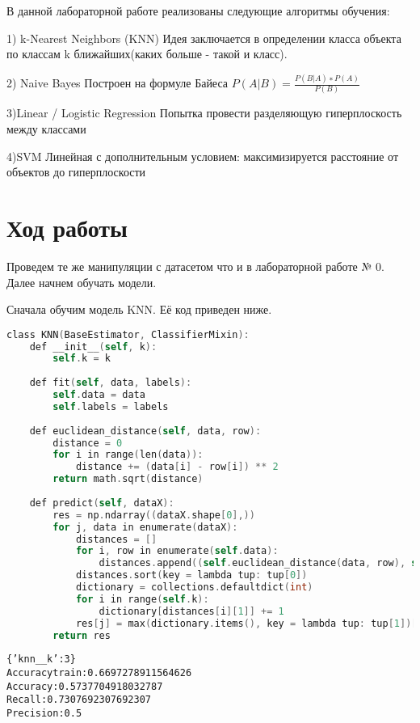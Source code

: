 В данной лабораторной работе реализованы следующие алгоритмы обучения:

1) k-Nearest Neighbors (KNN)
Идея заключается в определении класса объекта по классам k ближайших(каких
больше - такой и класс).

2) Naive Bayes
Построен на формуле Байеса  $ P(A|B)=  \frac{P(B|A)∗P(A) } {P(B)} $

3)Linear / Logistic Regression
Попытка провести разделяющую гиперплоскость между классами

4)SVM
Линейная с дополнительным условием: максимизируется расстояние от объектов до
гиперплоскости




\pagebreak

\section{Ход работы}


Проведем те же манипуляции с датасетом что и в лабораторной работе № 0.\\
Далее начнем обучать модели.

Сначала обучим модель KNN. Её код приведен ниже.

\begin{lstlisting}[language=C]
class KNN(BaseEstimator, ClassifierMixin):
    def __init__(self, k):
        self.k = k
        
    def fit(self, data, labels):
        self.data = data
        self.labels = labels
        
    def euclidean_distance(self, data, row):
        distance = 0
        for i in range(len(data)): 
            distance += (data[i] - row[i]) ** 2
        return math.sqrt(distance)
        
    def predict(self, dataX):
        res = np.ndarray((dataX.shape[0],))
        for j, data in enumerate(dataX):
            distances = []
            for i, row in enumerate(self.data):
                distances.append((self.euclidean_distance(data, row), self.labels[i]))
            distances.sort(key = lambda tup: tup[0])
            dictionary = collections.defaultdict(int)
            for i in range(self.k):
                dictionary[distances[i][1]] += 1
            res[j] = max(dictionary.items(), key = lambda tup: tup[1])[0]
        return res
\end{lstlisting}

\begin{alltt}
\{'knn\_\_k': 3\}
Accuracy train: 0.6697278911564626
Accuracy: 0.5737704918032787
Recall: 0.7307692307692307
Precision: 0.5
\end{alltt}

